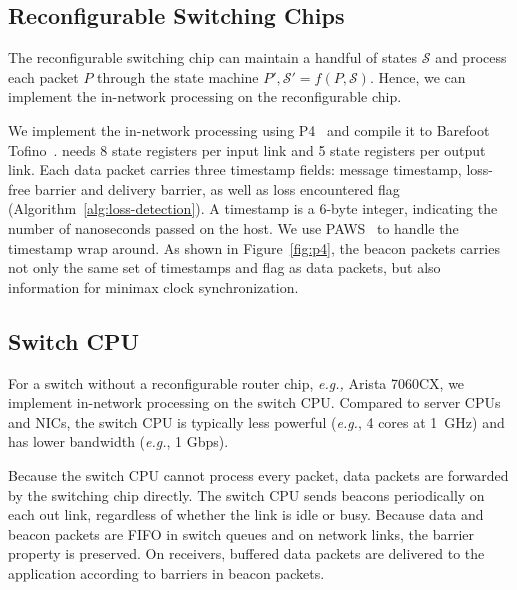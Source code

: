 \subsection{Reconfigurable Switching Chips}
\label{sec:p4}
The reconfigurable switching chip can maintain 
a handful of states $\mathcal{S}$ and process each packet $P$ through the state machine $P', \mathcal{S}' = f(P, \mathcal{S})$. Hence, we can implement the in-network processing on the reconfigurable chip. 

We implement the in-network processing using P4~\cite{bosshart2014p4} and compile it to Barefoot Tofino~\cite{tofino}. \sys needs 8 state registers per input link and 5 state registers per output link. Each data packet carries three timestamp fields: message timestamp, loss-free barrier and delivery barrier, as well as loss encountered flag (Algorithm~\ref{alg:loss-detection}).
A timestamp is a 6-byte integer, indicating the number of nanoseconds passed on the host. %
We use PAWS~\cite{jacobson1992tcp} to handle the timestamp wrap around.
As shown in Figure~\ref{fig:p4}, the beacon packets carries not only the same set of timestamps and flag as data packets, but also information for minimax clock synchronization.

\subsection{Switch CPU}
\label{sec:commodity}

For a switch without a reconfigurable router chip, \textit{e.g.,} Arista 7060CX, we implement in-network processing on the switch CPU. 
Compared to server CPUs and NICs, the switch CPU is typically less powerful (\textit{e.g.}, 4 cores at 1~GHz) and has lower bandwidth (\textit{e.g.}, 1 Gbps).

Because the switch CPU cannot process every packet, data packets are forwarded by the switching chip directly. 
The switch CPU sends beacons periodically on each out link, regardless of whether the link is idle or busy.
Because data and beacon packets are FIFO in switch queues and on network links, the barrier property is preserved. On receivers, buffered data packets are delivered to the application according to barriers in beacon packets.

